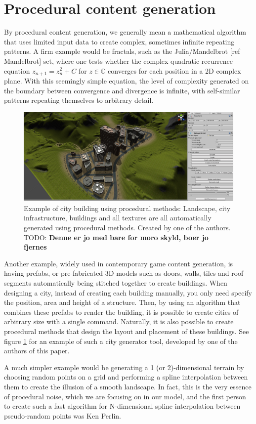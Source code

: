 \documentclass[aps,pre,twocolumn,letterpaper,floatfix,showpacs]{revtex4}
\newcommand{\todo}[1]{ {\color{Magenta} TODO: \color{Blue} \textbf{#1} }}
\begin{document}
\section{Procedural content generation}
By procedural content generation, we generally mean a mathematical algorithm that uses limited input data to create complex, sometimes infinite repeating patterns. A firm example would be fractals, such as the Julia/Mandelbrot [ref Mandelbrot] set, where one tests whether the complex quadratic recurrence equation $z_{n+1} = z_n^2 +C$ for $z \in \mathbb C$ converges for each position in a 2D complex plane. With this seemingly simple equation, the level of complexity generated on the boundary between convergence and divergence is infinite, with self-similar patterns repeating themselves to arbitrary detail.
\begin{figure}
\includegraphics[width=.5\textwidth]{orphancity.png}
\caption{Example of city building using procedural methods: Landscape, city infrastructure, buildings and all textures are all automatically generated using procedural methods. Created by one of the authors. \todo{Denne er jo med bare for moro skyld, boer jo fjernes} }
\label{fig:orphancity}
\end{figure}

Another example, widely used in contemporary game content generation, is having prefabs, or pre-fabricated 3D models such as doors, walls, tiles and roof segments automatically being stitched together to create buildings. When designing a city, instead of creating each building manually, you only need specify the position, area and height of a structure. Then, by using an algorithm that combines these prefabs to render the building, it is possible to create cities of arbitrary size with a single command. Naturally, it is also possible to create procedural methods that design the layout and placement of these buildings. See figure \ref{fig:orphancity} for an example of such a city generator tool, developed by one of the authors of this paper. 

A much simpler example would be generating a 1 (or 2)-dimensional terrain by choosing random points on a grid and performing a spline interpolation between them to create the illusion of a smooth landscape. In fact, this is the very essence of procedural noise, which we are focusing on in our model, and the first person to create such a fast algorithm for N-dimensional spline interpolation between pseudo-random points was Ken Perlin.   
\end{document}
